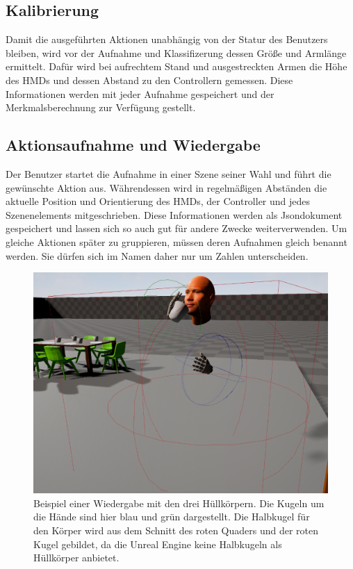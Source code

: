 \subsection{Kalibrierung}
Damit die ausgeführten Aktionen unabhängig von der Statur des Benutzers bleiben, wird vor der Aufnahme und Klassifizerung dessen Größe und Armlänge ermittelt. Dafür wird bei aufrechtem Stand und ausgestreckten Armen die Höhe des HMDs und dessen Abstand zu den Controllern gemessen. Diese Informationen werden mit jeder Aufnahme gespeichert und der Merkmalsberechnung zur Verfügung gestellt. 

\subsection{Aktionsaufnahme und Wiedergabe}
Der Benutzer startet die Aufnahme in einer Szene seiner Wahl und führt die gewünschte Aktion aus. Währendessen wird in regelmäßigen Abständen die aktuelle Position und Orientierung des HMDs, der Controller und jedes Szenenelements mitgeschrieben. Diese Informationen werden als Jsondokument gespeichert und lassen sich so auch gut für andere Zwecke weiterverwenden. Um gleiche Aktionen später zu gruppieren, müssen deren Aufnahmen gleich benannt werden. Sie dürfen sich im Namen daher nur um Zahlen unterscheiden.\newline
\begin{figure}[hbtp]
\includegraphics[width=1.0\linewidth]{PlaybackActor.png}
\caption{Beispiel einer Wiedergabe mit den drei Hüllkörpern. Die Kugeln um die Hände sind hier blau und grün dargestellt. Die Halbkugel für den Körper wird aus dem Schnitt des roten Quaders und der roten Kugel gebildet, da die Unreal Engine keine Halbkugeln als Hüllkörper anbietet.}
\label{fig:playback-actor}
\end{figure}
